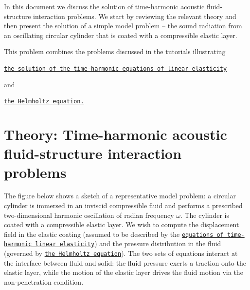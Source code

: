 In this document we discuss the solution of time-\/harmonic acoustic fluid-\/structure interaction problems. We start by reviewing the relevant theory and then present the solution of a simple model problem -- the sound radiation from an oscillating circular cylinder that is coated with a compressible elastic layer.

This problem combines the problems discussed in the tutorials illustrating
\begin{DoxyItemize}
\item \href{../../../time_harmonic_linear_elasticity/elastic_annulus/html/index.html}{\tt the solution of the time-\/harmonic equations of linear elasticity}
\end{DoxyItemize}and
\begin{DoxyItemize}
\item \href{../../../helmholtz/scattering/html/index.html}{\tt the Helmholtz equation.}
\end{DoxyItemize}

 

\hypertarget{index_theory}{}\section{Theory\+: Time-\/harmonic acoustic fluid-\/structure interaction problems}\label{index_theory}
The figure below shows a sketch of a representative model problem\+: a circular cylinder is immersed in an inviscid compressible fluid and performs a prescribed two-\/dimensional harmonic oscillation of radian frequency $\omega$. The cylinder is coated with a compressible elastic layer. We wish to compute the displacement field in the elastic coating (assumed to be described by the \href{../../../time_harmonic_linear_elasticity/elastic_annulus/html/index.html}{\tt equations of time-\/harmonic linear elasticity}) and the pressure distribution in the fluid (governed by \href{../../../helmholtz/scattering/html/index.html}{\tt the Helmholtz equation}). The two sets of equations interact at the interface between fluid and solid\+: the fluid pressure exerts a traction onto the elastic layer, while the motion of the elastic layer drives the fluid motion via the non-\/penetration condition.

